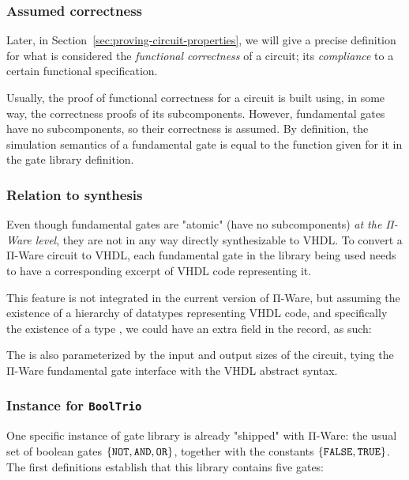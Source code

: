             \subsubsection{Assumed correctness}
            Later, in Section~\ref{sec:proving-circuit-properties}, we will give a precise definition
            for what is considered the \emph{functional correctness} of a circuit; its \emph{compliance}
            to a certain functional specification.

            Usually, the proof of functional correctness for a circuit is built using, in some way,
            the correctness proofs of its subcomponents.
            However, fundamental gates have no subcomponents, so their correctness is assumed.
            By definition, the simulation semantics of a fundamental gate is equal to the 
            function given for it in the gate library definition.

            \subsubsection{Relation to synthesis}
            Even though fundamental gates are "atomic" (have no subcomponents) \emph{at the Π-Ware level},
            they are not in any way directly synthesizable to \ac{VHDL}.
            To convert a Π-Ware circuit to \ac{VHDL}, each fundamental gate in the library being used
            needs to have a corresponding excerpt of \ac{VHDL} code representing it.

            This feature is not integrated in the current version of Π-Ware, but assuming the existence
            of a hierarchy of datatypes representing \ac{VHDL} code, and specifically the existence
            of a type , we could have an extra field in the  record, as such:

            \begin{center}
                \AY{:} \AY{(} \AY{:}  \AY{(} \AY{)}\AY{)}   \AY{(} \AY{)} \AY{(} \AY{)}
            \end{center}

            The  is also parameterized by the input and output sizes of the circuit,
            tying the Π-Ware fundamental gate interface with the \ac{VHDL} abstract syntax.

            \subsubsection{Instance for \texttt{BoolTrio}}
            One specific instance of gate library is already "shipped" with Π-Ware:
            the usual set of boolean gates
            $\{ \text{\texttt{NOT}}, \text{\texttt{AND}}, \text{\texttt{OR}} \}$, together with
            the constants $\{ \text{\texttt{FALSE}}, \text{\texttt{TRUE}} \}$.
            The first definitions establish that this library contains five gates:

